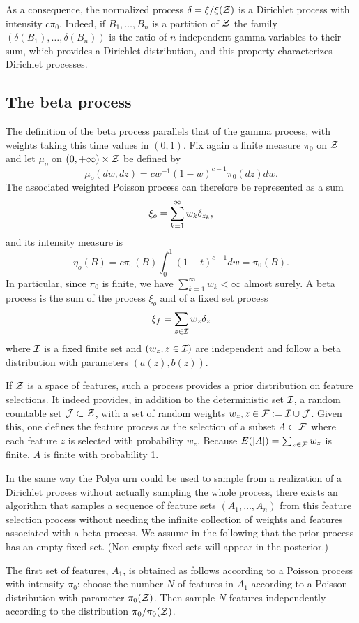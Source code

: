 As a consequence, the normalized process $\delta = \xi/\xi({\mathcal Z})$ is a Dirichlet process with intensity $c\pi_0$. Indeed, if $B_1, \ldots, B_n$ is a partition of ${\mathcal Z}$ the family $(\delta(B_1), \ldots, \delta(B_n))$ is the ratio of $n$ independent gamma variables to their sum, which provides a Dirichlet distribution, and this property characterizes Dirichlet processes.

\subsection{The beta process}

The definition of the beta process parallels that of the gamma process, with weights taking this time values in $(0,1)$. Fix again a finite measure $\pi_0$ on ${\mathcal Z}$ and let  $\mu_o$ on $(0, +\infty) \times {\mathcal Z}$ be defined by
\[
\mu_o(dw, dz) = cw^{-1} (1-w)^{c-1}  \pi_0(dz) dw.
\]
The associated weighted Poisson process can therefore be represented as a sum
\[
\xi_o = \sum_{k=1}^\infty w_k \delta_{z_k},
\]
and its intensity measure is
\[
\eta_o(B) = c \pi_0(B) \int_0^{1} (1-t)^{c-1} dw = \pi_0(B).
\]
In particular, since $\pi_0$ is finite, we have $\sum_{k=1}^\infty w_k <\infty$ almost surely. A beta process is the sum of the process $\xi_o$ and of a fixed set process
\[
\xi_f = \sum_{z\in {\mathcal I}} w_z \delta_z
\]
where ${\mathcal I}$ is a fixed finite set and $(w_z, z\in{\mathcal I})$ are independent and follow a beta distribution with parameters $(a(z), b(z))$.

If ${\mathcal Z}$ is a space of features, such a process provides a prior distribution on feature selections. It indeed provides, in addition to the deterministic set ${\mathcal I}$, a random countable set ${\mathcal J}\subset {\mathcal Z}$, with a set of random weights $w_z, z\in {\mathcal F}:= {\mathcal I}\cup {\mathcal J}$. Given this, one defines the feature process as the selection of a subset $A \subset {\mathcal F}$ where each feature $z$ is selected with probability $w_z$. Because $E(|A|) = \sum_{z\in {\mathcal F}} w_z$ is finite, $A$ is finite with probability 1.

In the same way the Polya urn could be used to sample from a realization of a Dirichlet process  without actually sampling the whole process, there exists an algorithm that samples a sequence of feature sets $(A_1, \ldots, A_n)$ from this feature selection process without needing the infinite collection of weights and features associated with a beta process. We assume in the following that the prior process has an empty fixed set. (Non-empty fixed sets will appear in the posterior.)

The first set of features, $A_1$, is obtained as follows according to a Poisson process with intensity $\pi_0$: choose the number $N$ of  features in $A_1$ according to a Poisson distribution with parameter $\pi_0({\mathcal Z})$. Then sample $N$ features independently according to the distribution $\pi_0/\pi_0({\mathcal Z})$. 

